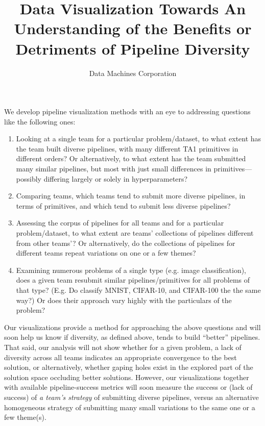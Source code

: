 \documentclass{article}
\title{Data Visualization Towards An Understanding of the Benefits or Detriments of Pipeline Diversity}
\author{Data Machines Corporation}
\begin{document}
\maketitle

We develop pipeline visualization methods with an eye to addressing
questions like the following ones:

\begin{enumerate}
\item 
  Looking at a single team for a particular problem/dataset, to what
  extent has the team built diverse pipelines, with many different TA1
  primitives in different orders?  Or alternatively, to what extent
  has the team submitted many similar pipelines, but most with just
  small differences in primitives---possibly differing largely or
  solely in hyperparameters?
\item
  Comparing teams, which teams tend to submit more diverse pipelines,
  in terms of primitives, and which tend to submit less diverse
  pipelines?
\item
  Assessing the corpus of pipelines for all teams and for a particular
  problem/dataset, to what extent are teams' collections of pipelines
  different from other teams'?  Or alternatively, do the collections of
  pipelines for different teams repeat variations on one or a few
  themes?
\item
  Examining numerous problems of a single type (e.g. image
  classification), does a given team resubmit similar
  pipelines/primitives for all problems of that type?  (E.g. Do
  classify MNIST, CIFAR-10, and CIFAR-100 the the same way?)  Or does
  their approach vary highly with the particulars of the problem?
\end{enumerate}

Our visualizations provide a method for approaching the above questions
and will soon help us know if diversity, as defined above, tends to
build ``better'' pipelines.  That said, our analysis will not show
whether for a given problem, a lack of diversity across all teams
indicates an appropriate convergence to the best solution, or
alternatively, whether gaping holes exist in the explored part of the
solution space occluding better solutions. However, our
visualizations together with available pipeline-success metrics will
soon measure the success or (lack of success) of \emph{a team's
  strategy} of submitting diverse pipelines, versus an alternative
homogeneous strategy of submitting many small variations to the same
one or a few theme(s).
\end{document}
